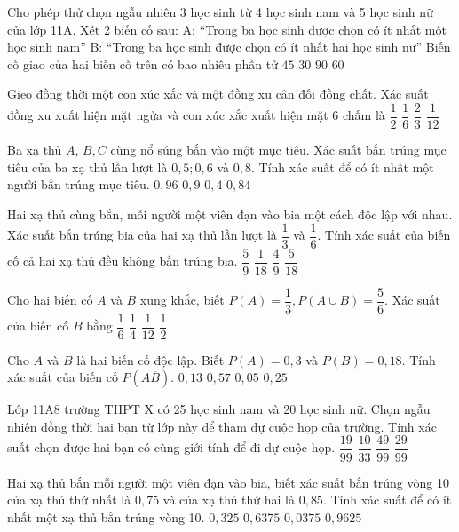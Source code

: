 \begin{ex}
Cho phép thử chọn ngẫu nhiên 3 học sinh từ 4 học sinh nam và 5 học sinh nữ của lớp 11A. Xét 2 biến cố sau:
A: “Trong ba học sinh được chọn có ít nhất một học sinh nam”
B: “Trong ba học sinh được chọn có ít nhất hai học sinh nữ”
Biến cố giao của hai biến cố trên có bao nhiêu phần tử
\choice
{$45$}
{\True $30$}
{$90$}
{$60$}
\end{ex}
\begin{ex}
Gieo đồng thời một con xúc xắc và một đồng xu cân đối đồng chất. Xác suất đồng xu xuất hiện mặt ngửa và con xúc xắc xuất hiện mặt $6$ chấm là
\choice
{$\dfrac{1}{2}$}
{$\dfrac{1}{6}$}
{$\dfrac{2}{3}$}
{\True $\dfrac{1}{12}$}
\end{ex}
\begin{ex}
Ba xạ thủ $A$, $B,C$ cùng nổ súng bắn vào một mục tiêu. Xác suất bắn trúng mục tiêu của ba xạ thủ lần lượt là $0{,}5 ;0{,}6$ và $0{,}8$. Tính xác suất để có ít nhất một người bắn trúng mục tiêu.
\choice
{\True $0{,}96$}
{$0{,}9$}
{$0{,}4$}
{$0{,}84$}
\end{ex}
\begin{ex}
Hai xạ thủ cùng bắn, mỗi người một viên đạn vào bia một cách độc lập với nhau.
Xác suất bắn trúng bia của hai xạ thủ lần lượt là $\dfrac{1}{3}$ và $\dfrac{1}{6}$. Tính xác suất của biến cố cả hai
xạ thủ đều không bắn trúng bia.
\choice
{\True $\dfrac{5}{9}$}
{$\dfrac{1}{18}$}
{$\dfrac{4}{9}$}
{$\dfrac{5}{18}$}
\end{ex}
\begin{ex}
Cho hai biến cố $A$ và $B$ xung khắc, biết $P(A)=\dfrac{1}{3},P\left(A\cup B\right)=\dfrac{5}{6}$. Xác suất của biến cố $B$ bằng
\choice
{$\dfrac{1}{6}$}
{$\dfrac{1}{4}$}
{$\dfrac{1}{12}$}
{\True $\dfrac{1}{2}$}
\end{ex}
\begin{ex}
Cho ${A}$ và ${B}$ là hai biến cố độc lập. Biết $P(A)=0{,}3$ và $P(B)=0{,}18$. Tính xác suất của biến cố $P\left(A\overline{{B}}\right)$.
\choice
{${0{,}13}$}
{${0{,}57}$}
{${0{,}05}$}
{\True ${0{,}25}$}
\end{ex}
\begin{ex}
Lớp 11A8 trường THPT X có 25 học sinh nam và 20 học sinh nữ. Chọn ngẫu nhiên đồng thời hai bạn từ lớp này để tham dự cuộc họp của trường. Tính xác suất chọn được hai bạn có cùng giới tính để đi dự cuộc họp.
\choice
{$\dfrac{19}{99}$}
{$\dfrac{10}{33}$}
{\True $\dfrac{49}{99}$}
{$\dfrac{29}{99}$}
\end{ex}
\begin{ex}
Hai xạ thủ bắn mỗi người một viên đạn vào bia, biết xác suất bắn trúng vòng 10 của xạ thủ thứ nhất là $0{,}75$ và của xạ thủ thứ hai là $0{,}85$. Tính xác suất để có ít nhất một xạ thủ bắn trúng vòng 10.
\choice
{$0{,}325$}
{$0{,}6375$}
{$0{,}0375$}
{\True $0{,}9625$}
\end{ex}
